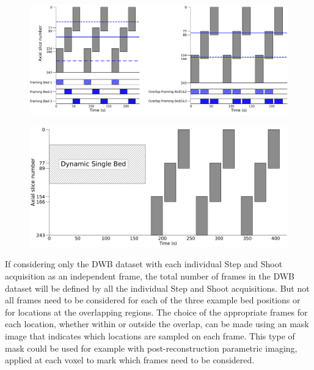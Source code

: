 \begin{figure} [h!]
\centering
\includegraphics[scale=0.50,angle=0]{3_Results/3_3_DWB_Reconstruction/figures/OverlapTiming.pdf}
\caption{} 
\label{fig_3_3:OverlapFraming}
\end{figure} 

\begin{figure} [h!]
\centering
\includegraphics[scale=0.28,angle=0]{3_Results/3_3_DWB_Reconstruction/figures/CompleteProtocolTiming.pdf}
\caption{} 
\label{fig_3_3:CompleteProtocolFraming}
\end{figure} 

If considering only the DWB dataset with each individual Step and Shoot acquisition as an independent frame, the total number of frames in the DWB dataset will be defined by all the individual Step and Shoot acquisitions.%
But not all frames need to be considered for each of the three example bed positions or for locations at the overlapping regions. 
The choice of the appropriate frames for each location, whether within or outside the overlap, can be made using an mask image that indicates which locations are sampled on each frame. This type of mask could be used for example with post-reconstruction parametric imaging, applied at each voxel to mark which frames need to be considered.

